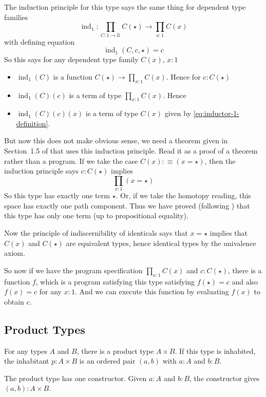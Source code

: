 \documentclass[11pt]{article}
\DeclareMathOperator{\inductor}{ind}
\newcommand{\universe}{\mathcal{U}}
\begin{document}
The induction principle for this type says the same thing for
dependent type families
$$
   \inductor_1 : \prod_{C : 1 \to \universe} C(\star) \to \prod_{x : 1} C(x)
$$
with defining equation
\begin{equation} \label{eq:inductor-1-definition}
   \inductor_1(C, c, \star) = c
\end{equation}
So this says for any dependent type family $C(x)$, $x : 1$
\begin{itemize}
\item $\inductor_1(C)$ is a function $C(\star) \to \prod_{x : 1} C(x)$.
    Hence for $c : C(\star)$
\item $\inductor_1(C)(c)$ is a term of type $\prod_{x : 1} C(x)$.  Hence
\item $\inductor_1(C)(c)(x)$ is a term of type $C(x)$ given
    by \eqref{eq:inductor-1-definition}.
\end{itemize}
But now this does not make obvious sense, we need a theorem given in
Section~1.5 of  that  uses this induction principle.
Read it as a proof of a theorem rather than a program.
If we take the case $C(x) :\equiv (x = \star)$, then the induction principle
says $c : C(\star)$ implies
$$
   \prod_{x : 1} (x = \star)
$$
So this type has exactly one term $\star$.
Or, if we take the homotopy reading,
this space has exactly one path component.
Thus we have proved (following ) that this type has only
one term (up to propositional equality).

Now the principle of indiscernibility of identicals
 says that $x = \star$ implies that
$C(x)$ and $C(\star)$ are equivalent types, hence identical types by the
univalence axiom.

So now if we have the program specification $\prod_{x : 1} C(x)$ and
$c : C(\star)$, there is a function $f$, which is a program satisfying this
type satisfying $f(\star) = c$ and also $f(x) = c$ for any $x : 1$.
And we can execute this function by evaluating $f(x)$ to obtain $c$.

\subsection{Product Types}

For any types $A$ and $B$, there is a product type $A \times B$.
If this type is inhabited, the inhabitant $p : A \times B$ is an ordered
pair $(a, b)$ with $a : A$ and $b : B$.

The product type has one constructor.  Given $a : A$ and $b : B$, the
constructor gives $(a, b) : A \times B$.
\end{document}
